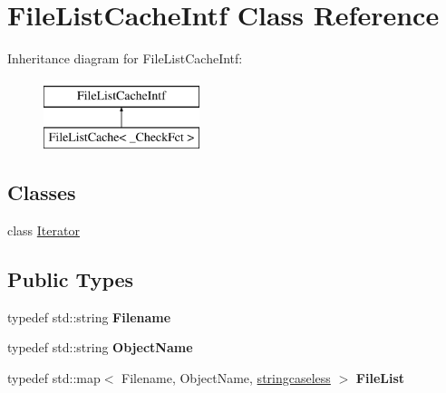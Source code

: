 \hypertarget{class_file_list_cache_intf}{
\section{FileListCacheIntf Class Reference}
\label{class_file_list_cache_intf}
}
Inheritance diagram for FileListCacheIntf:\begin{figure}[H]
\begin{center}
\leavevmode
\includegraphics[height=2cm]{class_file_list_cache_intf}
\end{center}
\end{figure}
\subsection*{Classes}
\begin{DoxyCompactItemize}
\item 
class \hyperlink{class_file_list_cache_intf_1_1_iterator}{Iterator}
\end{DoxyCompactItemize}
\subsection*{Public Types}
\begin{DoxyCompactItemize}
\item 
\hypertarget{class_file_list_cache_intf_afaeb64e9d3dea8eefb7397b1bd1cbca6}{
typedef std::string {\bfseries Filename}}
\label{class_file_list_cache_intf_afaeb64e9d3dea8eefb7397b1bd1cbca6}

\item 
\hypertarget{class_file_list_cache_intf_a5e72270ab7eaf448ab46ed076737172d}{
typedef std::string {\bfseries ObjectName}}
\label{class_file_list_cache_intf_a5e72270ab7eaf448ab46ed076737172d}

\item 
\hypertarget{class_file_list_cache_intf_ab7d0ac0d0c44f04a638dd530b8229294}{
typedef std::map$<$ Filename, ObjectName, \hyperlink{structstringcaseless}{stringcaseless} $>$ {\bfseries FileList}}
\label{class_file_list_cache_intf_ab7d0ac0d0c44f04a638dd530b8229294}

\end{DoxyCompactItemize}
